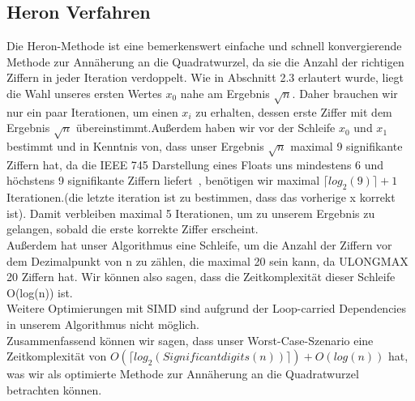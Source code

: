 \documentclass[course=erap]{aspdoc}
\begin{document}
\subsection{Heron Verfahren}
Die Heron-Methode ist eine bemerkenswert einfache und schnell konvergierende Methode zur Annäherung an die Quadratwurzel, da sie die Anzahl der richtigen Ziffern in jeder Iteration verdoppelt.
Wie in Abschnitt 2.3 erlautert wurde, liegt die Wahl unseres ersten Wertes $x_0$ nahe am Ergebnis $\sqrt{n}$. Daher brauchen wir nur ein paar Iterationen, um einen $x_i$ zu erhalten, dessen erste Ziffer mit dem Ergebnis $\sqrt{n}$ übereinstimmt.Außerdem haben wir vor der Schleife $x_0$ und $x_1$ bestimmt
und in Kenntnis von, dass unser Ergebnis $\sqrt{n}$ maximal 9 signifikante Ziffern hat, da die IEEE 745 Darstellung eines Floats uns mindestens 6 und höchstens 9 signifikante Ziffern liefert~\cite{HeronsPerformanz}, benötigen wir maximal $\lceil log_2(9)  \rceil +1$ Iterationen.(die letzte iteration ist zu bestimmen, dass das vorherige x korrekt ist). Damit verbleiben maximal 5 Iterationen, um zu unserem Ergebnis zu gelangen, sobald die erste korrekte Ziffer erscheint.\\
Außerdem hat unser Algorithmus eine Schleife, um die Anzahl der Ziffern vor dem Dezimalpunkt von n zu zählen, die maximal 20 sein kann, da ULONGMAX 20 Ziffern hat.
Wir können also sagen, dass die Zeitkomplexität dieser Schleife O(log(n)) ist. \\
Weitere Optimierungen mit SIMD sind aufgrund der Loop-carried Dependencies in unserem Algorithmus nicht möglich. \\
Zusammenfassend können wir sagen, dass unser Worst-Case-Szenario eine Zeitkomplexität von $O(\lceil log_2(Significantdigits(n))  \rceil) + O(log(n)) $ hat, was wir als optimierte Methode zur Annäherung an die Quadratwurzel betrachten können.
\end{document}
